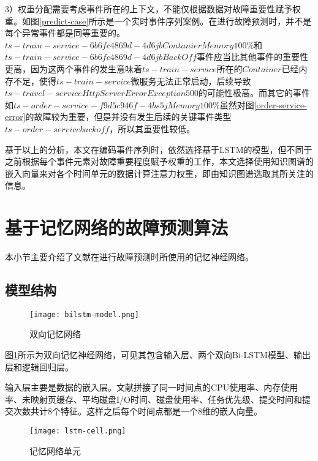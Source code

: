 3）权重分配需要考虑事件所在的上下文，不能仅根据数据对故障重要性赋予权重。如图\ref{predict-case}所示是一个实时事件序列案例。在进行故障预测时，并不是每个异常事件都是同等重要的。$ts-train-service-6b6fc4869d-4d6jb Contanier Memory 100\%$和$ts-train-service-6b6fc4869d-4d6jb BackOff$事件应当比其他事件的重要性更高，因为这两个事件的发生意味着$ts-train-service$所在的$Container$已经内存不足，使得$ts-train-service$微服务无法正常启动，后续导致$ts-travel-service  HttpServerErrorException 500$的可能性极高。而其它的事件如$ts-order-service-f9d5c946f-4bs5j Memory 100\%$虽然对图\ref{order-service-error}的故障较为重要，但是并没有发生后续的关键事件类型$ts-order-service backoff$，所以其重要性较低。

基于以上的分析，本文在编码事件序列时，依然选择基于LSTM的模型，但不同于之前根据每个事件元素对故障重要程度赋予权重的工作，本文选择使用知识图谱的嵌入向量来对各个时间单元的数据计算注意力权重，即由知识图谱选取其所关注的信息。

\section{基于记忆网络的故障预测算法}\label{memory-net-section}
本小节主要介绍了文献\parencite{gao2020task}在进行故障预测时所使用的记忆神经网络。
\subsection{模型结构}
\begin{figure}[htbp]
    \centering
    \texttt{[image: bilstm-model.png]}
    \caption{双向记忆网络\label{bilstm-model}}
\end{figure}
图\ref{bilstm-model}所示为双向记忆神经网络，可见其包含输入层、两个双向Bi-LSTM模型、输出层和逻辑回归层。

输入层主要是数据的嵌入层。文献\parencite{gao2020task}拼接了同一时间点的CPU使用率、内存使用率、未映射页缓存、平均磁盘I/O时间、磁盘使用率、任务优先级、提交时间和提交次数共计8个特征。这样之后每个时间点都是一个8维的嵌入向量。
\begin{figure}[htbp]
    \centering
    \texttt{[image: lstm-cell.png]}
    \caption{记忆网络单元\label{lstm-cell}}
\end{figure}

